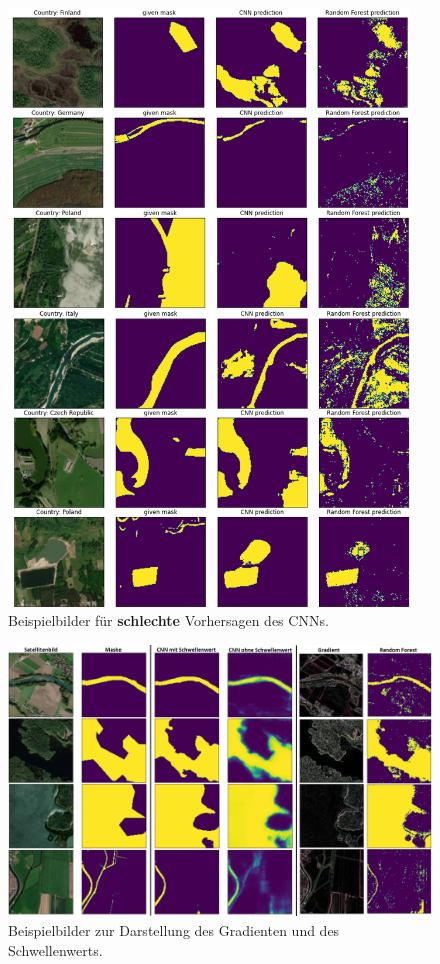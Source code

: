 \begin{figure}
    \centering
    \caption{Beispielbilder für \textbf{schlechte} Vorhersagen des CNNs.\cite{mapbox}\cite{openstreetmap}}
    \label{fig:ergebnisse_schlecht}
    \includegraphics[width=0.95\textwidth]{content/img/ergebnisse_schlecht.png}
\end{figure}

\begin{figure}
    \centering
    \caption{Beispielbilder zur Darstellung des Gradienten und des Schwellenwerts.\cite{mapbox}\cite{openstreetmap}}
    \label{fig:gradient_schwellenwert}
    \includegraphics[width=\textwidth]{content/img/gradient_threshold.png}
\end{figure}